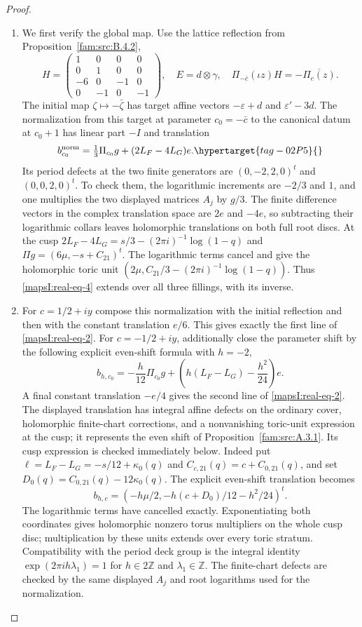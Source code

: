 \begin{proof}
\begin{enumerate}[label=\arabic*.,leftmargin=*]
\item We first verify the global map. Use the lattice reflection from Proposition~\ref{fam:src:B.4.2},
\[
 H=\begin{pmatrix}1&0&0&0\\0&1&0&0\\-6&0&-1&0\\0&-1&0&-1\end{pmatrix},
 \quad E=d\otimes\gamma,
 \quad\Pi_{-\bar c}(\iota z)H=-\overline{\Pi_c(z)}.
\]
The initial map $\zeta\mapsto-\bar\zeta$ has target affine vectors
$-\varepsilon+d$ and $\varepsilon'-3d$. The normalization from this
target at parameter $c_0=-\bar c$ to the canonical datum at $c_0+1$
has linear part $-I$ and translation
\[
 b^{\rm norm}_{c_0}=\tfrac13\Pi_{c_0}g+(2L_F-4L_G)e.
 \hypertarget{tag-02P5}{}\label{mapsI:real-eq-4}
\]
Its period defects at the two finite generators are
$(0,-2,2,0)^t$ and $(0,0,2,0)^t$. To check them, the logarithmic increments
are $-2/3$ and $1$, and one multiplies the two displayed matrices $A_j$
by $g/3$. The finite difference vectors in the complex translation space are $2e$ and $-4e$, so subtracting
their logarithmic collars leaves holomorphic translations on both full
root discs. At the cusp
$2L_F-4L_G=s/3-(2\pi i)^{-1}\log(1-q)$ and
$\Pi g=(6\mu,-s+C_{21})^t$. The logarithmic terms cancel and give the
holomorphic toric unit
$(2\mu,C_{21}/3-(2\pi i)^{-1}\log(1-q))$.
Thus \eqref{mapsI:real-eq-4} extends over all three fillings, with its inverse.

\item For $c=1/2+iy$ compose this normalization with the initial reflection
and then with the constant translation $e/6$. This gives exactly the
first line of \eqref{mapsI:real-eq-2}. For $c=-1/2+iy$, additionally close the parameter
shift by the following explicit even-shift formula with $h=-2$,
\[
 b_{h,c_0}=-\frac h{12}\Pi_{c_0}g+
 \left(h(L_F-L_G)-\frac{h^2}{24}\right)e.
\]
A final constant translation $-e/4$ gives the second line of \eqref{mapsI:real-eq-2}.
The displayed translation has integral affine defects on the ordinary cover, holomorphic finite-chart corrections, and a nonvanishing toric-unit expression at the cusp; it represents the even shift of Proposition~\ref{fam:src:A.3.1}. Its cusp expression is checked immediately below. Indeed put $\ell=L_F-L_G=-s/12+\kappa_0(q)$ and
$C_{c,21}(q)=c+C_{0,21}(q)$, and set
$D_0(q)=C_{0,21}(q)-12\kappa_0(q)$.
The explicit even-shift translation becomes
\[
 b_{h,c}=
 \left(-h\mu/2,-h(c+D_0)/12-h^2/24\right)^t.
\]
The logarithmic terms have cancelled exactly. Exponentiating both
coordinates gives holomorphic nonzero torus multipliers on the whole cusp
disc; multiplication by these units extends over every toric stratum.
Compatibility with the period deck group is the integral identity
$\exp(2\pi i h\lambda_1)=1$ for $h\in2\mathbb Z$ and
$\lambda_1\in\mathbb Z$. The finite-chart defects are checked by the
same displayed $A_j$ and root logarithms used for the normalization.


\end{enumerate}
\end{proof}
